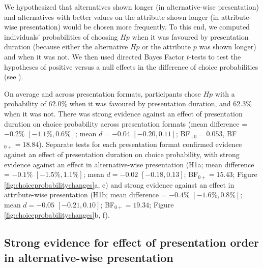 \documentclass[11pt, a4paper, twocolumn, abstract]{scrartcl}
\begin{document}
We hypothesized that alternatives shown longer (in alternative-wise presentation) and alternatives with better values on the attribute shown longer (in attribute-wise presentation) would be chosen more frequently. 
To this end, we computed individuals' probabilities of choosing $Hp$ when it was favoured by presentation duration (because either the alternative $Hp$ or the attribute $p$ was shown longer) and when it was not. We then used directed Bayes Factor $t$-tests to test the hypotheses of positive versus a null effects in the difference of choice probabilities (see ). 

On average and across presentation formats, participants chose $Hp$ with a probability of 62.0\% when it was favoured by presentation duration, and 62.3\% when it was not.
There was strong evidence against an effect of presentation duration on choice probability across presentation formats (mean difference = $-0.2\%$ $[-1.1\%, 0.6\%]$; mean $d = -0.04$ $[-0.20, 0.11]$; BF$_{{+}0} = 0.053$, BF$_{0{+}} = 18.84$).
Separate tests for each presentation format confirmed evidence against an effect of presentation duration on choice probability, with strong evidence against an effect in alternative-wise presentation (H1a; mean difference = $-0.1\%$ $[-1.5\%, 1.1\%]$; mean $d = -0.02$ $[-0.18, 0.13]$; BF$_{0{+}} = 15.43$; Figure \ref{fig:choiceprobabilitychanges}a, e) and strong evidence against an effect in attribute-wise presentation (H1b; mean difference = $-0.4\%$ $[-1.6\%, 0.8\%]$; mean $d = -0.05$ $[-0.21, 0.10]$; BF$_{0{+}} = 19.34$; Figure \ref{fig:choiceprobabilitychanges}b, f). 

\subsection*{Strong evidence for effect of presentation order in alternative-wise presentation}
\end{document}
